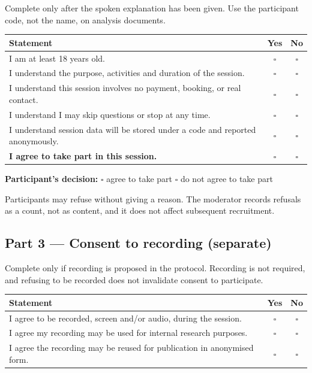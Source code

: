 \documentclass[]{interact}
\theoremstyle{plain}
\begin{document}
Complete only after the spoken explanation has been given. Use the participant code, not the name, on
analysis documents.

\begin{center}
\begin{tabular}{@{}p{}cc@{}}
\toprule
\textbf{Statement} & \textbf{Yes} & \textbf{No} \\
\midrule
I am at least 18 years old. & $\square$ & $\square$ \\
I understand the purpose, activities and duration of the session. & $\square$ & $\square$ \\
I understand this session involves no payment, booking, or real contact. & $\square$ & $\square$ \\
I understand I may skip questions or stop at any time. & $\square$ & $\square$ \\
I understand session data will be stored under a code and reported anonymously. & $\square$ & $\square$ \\
\textbf{I agree to take part in this session.} & $\square$ & $\square$ \\
\bottomrule
\end{tabular}
\end{center}

\textbf{Participant's decision:} $\square$ agree to take part \quad $\square$ do not agree to take part

Participants may refuse without giving a reason. The moderator records refusals as a count, not as
content, and it does not affect subsequent recruitment.

\subsection*{Part 3 --- Consent to recording (separate)}

Complete only if recording is proposed in the protocol. Recording is not required, and refusing to be
recorded does not invalidate consent to participate.

\begin{center}
\begin{tabular}{@{}p{}cc@{}}
\toprule
\textbf{Statement} & \textbf{Yes} & \textbf{No} \\
\midrule
I agree to be recorded, screen and/or audio, during the session. & $\square$ & $\square$ \\
I agree my recording may be used for internal research purposes. & $\square$ & $\square$ \\
I agree the recording may be reused for publication in anonymised form. & $\square$ & $\square$ \\
\bottomrule
\end{tabular}
\end{center}
\end{document}
